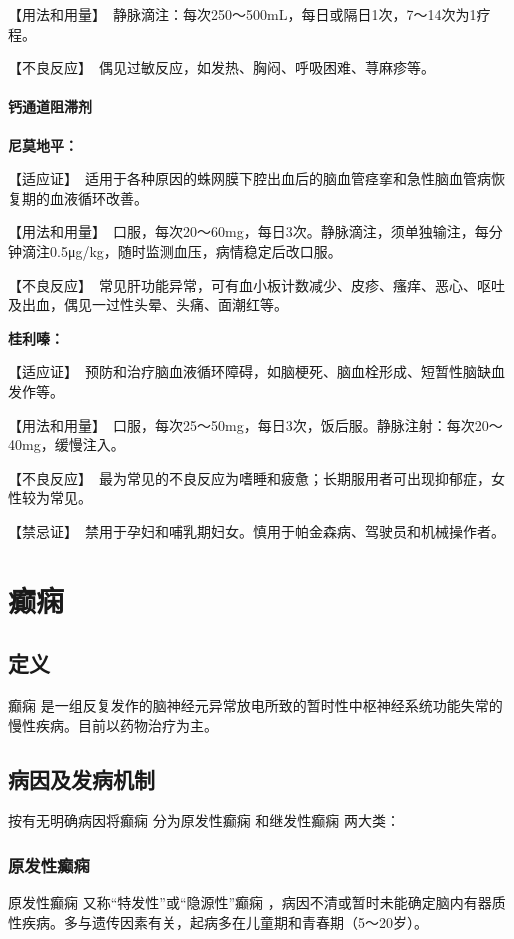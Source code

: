 【用法和用量】　静脉滴注：每次250～500mL，每日或隔日1次，7～14次为1疗程。

【不良反应】　偶见过敏反应，如发热、胸闷、呼吸困难、荨麻疹等。
\paragraph{钙通道阻滞剂}

\textbf{尼莫地平：}

【适应证】　适用于各种原因的蛛网膜下腔出血后的脑血管痉挛和急性脑血管病恢复期的血液循环改善。

【用法和用量】　口服，每次20～60mg，每日3次。静脉滴注，须单独输注，每分钟滴注0.5μg/kg，随时监测血压，病情稳定后改口服。

【不良反应】　常见肝功能异常，可有血小板计数减少、皮疹、瘙痒、恶心、呕吐及出血，偶见一过性头晕、头痛、面潮红等。

\textbf{桂利嗪：}

【适应证】　预防和治疗脑血液循环障碍，如脑梗死、脑血栓形成、短暂性脑缺血发作等。

【用法和用量】　口服，每次25～50mg，每日3次，饭后服。静脉注射：每次20～40mg，缓慢注入。

【不良反应】　最为常见的不良反应为嗜睡和疲惫；长期服用者可出现抑郁症，女性较为常见。

【禁忌证】　禁用于孕妇和哺乳期妇女。慎用于帕金森病、驾驶员和机械操作者。

\section{癫痫}

\subsection{定义}

癫痫
是一组反复发作的脑神经元异常放电所致的暂时性中枢神经系统功能失常的慢性疾病。目前以药物治疗为主。

\subsection{病因及发病机制}

按有无明确病因将癫痫
分为原发性癫痫
和继发性癫痫 两大类：

\subsubsection{原发性癫痫}

原发性癫痫
又称“特发性”或“隐源性”癫痫
，病因不清或暂时未能确定脑内有器质性疾病。多与遗传因素有关，起病多在儿童期和青春期（5～20岁）。

